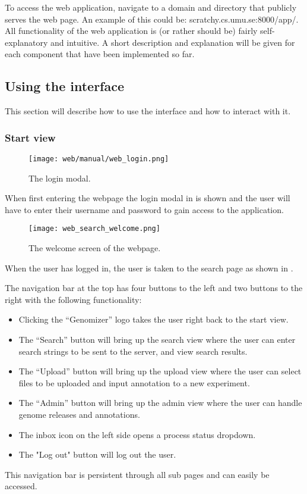 To access the web application, navigate to a domain and directory that publicly serves the web page. An example of this could be: scratchy.cs.umu.se:8000/app/.
All functionality of the web application is (or rather should be) fairly self-explanatory and intuitive. A short description and explanation will be given for each component that have been implemented so far.
\subsection{Using the interface}
This section will describe how to use the interface and how to interact with it.
\subsubsection{Start view}
\begin{figure}[h]
\centering
\texttt{[image: web/manual/web\_login.png]}
\caption{\label{fig:web_search_login} The login modal.}
\end{figure}
When first entering the webpage the login modal in  is shown and the user will have to enter their username and password to gain access to the application.

\begin{sidewaysfigure}[h] 
\centering
\texttt{[image: web\_search\_welcome.png]}
\caption{\label{fig:web_search_welcome} The welcome screen of the webpage.}
\end{sidewaysfigure}

When the user has logged in, the user is taken to the search page as shown in .

The navigation bar at the top has four buttons to the left and two buttons to the right with the following functionality:
\begin{itemize}
	\item Clicking the “Genomizer” logo takes the user right back to the start view.
	\item The “Search” button will bring up the search view where the user can enter search strings to be sent to the server, and view search results.
	\item The “Upload” button will bring up the upload view where the user can select files to be uploaded and input annotation to a new experiment.
	\item The “Admin” button will bring up the admin view where the user can handle genome releases and annotations.
    \item The inbox icon on the left side opens a process status dropdown.
    \item The "Log out" button will log out the user.
\end{itemize}
This navigation bar is persistent through all sub pages and can easily be accessed.

